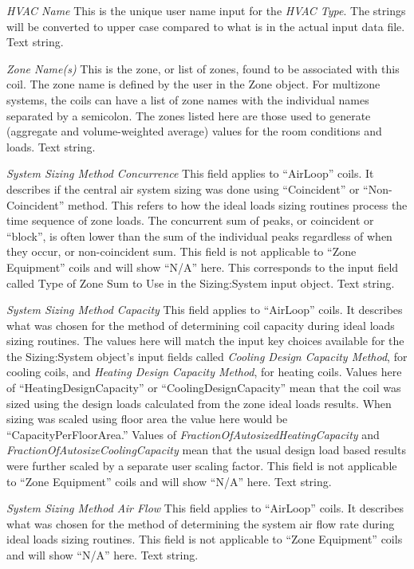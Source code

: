 \emph{HVAC Name} This is the unique user name input for the \emph{HVAC Type}.  The strings  will be converted to upper case compared to what is in the actual input data file.  Text string.

\emph{Zone Name(s)} This is the zone, or list of zones, found to be associated with this coil.  The zone name is defined by the user in the Zone object.  For multizone systems, the coils can have a list of zone names with the individual names separated by a semicolon. The zones listed here are those used to generate (aggregate and volume-weighted average) values for the room conditions and loads. Text string.

\emph{System Sizing Method Concurrence} This field applies to ``AirLoop'' coils.  It describes if the central air system sizing was done using ``Coincident'' or ``Non-Coincident'' method. This refers to how the ideal loads sizing routines process the time sequence of zone loads.  The concurrent sum of peaks, or coincident or ``block'', is often lower than the sum of the individual peaks regardless of when they occur, or non-coincident sum.  This field is not applicable to ``Zone Equipment'' coils and will show ``N/A'' here.  This corresponds to the input field called Type of Zone Sum to Use in the Sizing:System input object. Text string.

\emph{System Sizing Method Capacity} This field applies to ``AirLoop'' coils.  It describes what was chosen for the method of determining coil capacity during ideal loads sizing routines. The values here will match the input key choices available for the the Sizing:System object's input fields called \emph{Cooling Design Capacity Method}, for cooling coils, and \emph{Heating Design Capacity Method}, for heating coils. Values here of ``HeatingDesignCapacity'' or ``CoolingDesignCapacity'' mean that the coil was sized using the design loads calculated from the zone ideal loads results. When sizing was scaled using floor area the value here would be ``CapacityPerFloorArea.''  Values of \emph{FractionOfAutosizedHeatingCapacity} and \emph{FractionOfAutosizeCoolingCapacity} mean that the usual design load based results were further scaled by a separate user scaling factor. This field is not applicable to ``Zone Equipment'' coils and will show ``N/A'' here. Text string.

\emph{System Sizing Method Air Flow} This field applies to ``AirLoop'' coils.  It describes what was chosen for the method of determining the system air flow rate during ideal loads sizing routines. This field is not applicable to ``Zone Equipment'' coils and will show ``N/A'' here. Text string.

